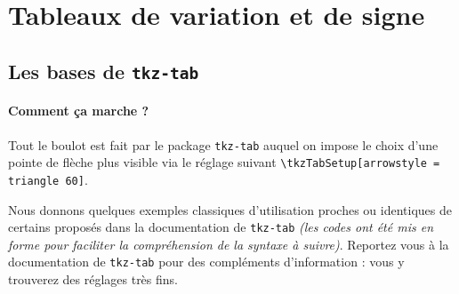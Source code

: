 \documentclass[12pt,a4paper]{article}
\begin{document}

\section{Tableaux de variation et de signe}

\subsection{Les bases de \texttt{tkz-tab}}

\paragraph{Comment ça marche ?}

Tout le boulot est fait par le package \verb+tkz-tab+ auquel on impose le choix d'une pointe de flèche plus visible via le réglage suivant \verb+\tkzTabSetup[arrowstyle = triangle 60]+.

\medskip

Nous donnons quelques exemples classiques d'utilisation proches ou identiques de certains proposés dans la documentation de \verb+tkz-tab+ \emph{(les codes ont été mis en forme pour faciliter la compréhension de la syntaxe à suivre)}.
Reportez vous à la documentation de \verb+tkz-tab+ pour des compléments d'information : vous y trouverez des réglages très fins.





\begin{latexex-flat}
\end{latexex-flat}





\begin{latexex-flat}
\end{latexex-flat}
\end{document}
